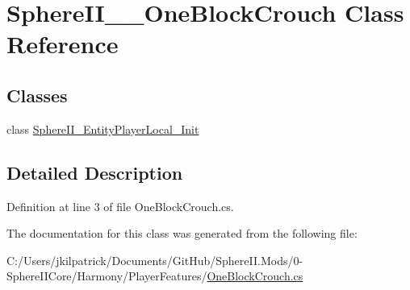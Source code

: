 \hypertarget{class_sphere_i_i_____one_block_crouch}{}\section{Sphere\+I\+I\+\_\+\+\_\+\+One\+Block\+Crouch Class Reference}
\label{class_sphere_i_i_____one_block_crouch}
\subsection*{Classes}
\begin{DoxyCompactItemize}
\item 
class \mbox{\hyperlink{class_sphere_i_i_____one_block_crouch_1_1_sphere_i_i___entity_player_local___init}{Sphere\+I\+I\+\_\+\+Entity\+Player\+Local\+\_\+\+Init}}
\end{DoxyCompactItemize}


\subsection{Detailed Description}


Definition at line 3 of file One\+Block\+Crouch.\+cs.



The documentation for this class was generated from the following file\+:\begin{DoxyCompactItemize}
\item 
C\+:/\+Users/jkilpatrick/\+Documents/\+Git\+Hub/\+Sphere\+I\+I.\+Mods/0-\/\+Sphere\+I\+I\+Core/\+Harmony/\+Player\+Features/\mbox{\hyperlink{_one_block_crouch_8cs}{One\+Block\+Crouch.\+cs}}\end{DoxyCompactItemize}
